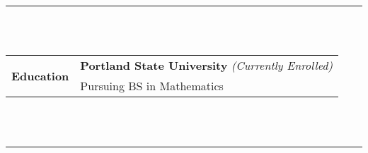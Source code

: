 \documentclass[12pt]{article}
\begin{document}
\\\\\rule{5.5in}{1pt}\\\\
\begin{tabular}{r|l}
\multirow{2}{*}{\textbf{Education}} & \textbf{Portland State University} \footnotesize\textit{(Currently Enrolled)}\\
& \footnotesize Pursuing BS in Mathematics\\
\end{tabular}
\\\\\rule{5.5in}{1pt}\\\\

\end{document}
